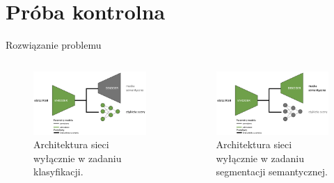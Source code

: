 \documentclass[10pt]{beamer}
\begin{document}
\section*{Próba kontrolna}
\begin{frame}{Rozwiązanie problemu}
    \begin{columns}
        \begin{column}{0.5\textwidth}
            \begin{figure}
                \includegraphics[width=\textwidth]{images/decoder-freezed.png}
                \caption{Architektura sieci wyłącznie w zadaniu klasyfikacji.}
            \end{figure}
            
        \end{column}
        
        \begin{column}{0.5\textwidth}
            \begin{figure}
                \includegraphics[width=\textwidth]{images/fc-freezed.png}
                \caption{Architektura sieci wyłącznie w zadaniu segmentacji semantycznej.}
            \end{figure}
            
        \end{column}
    \end{columns}

\end{frame}
\end{document}
